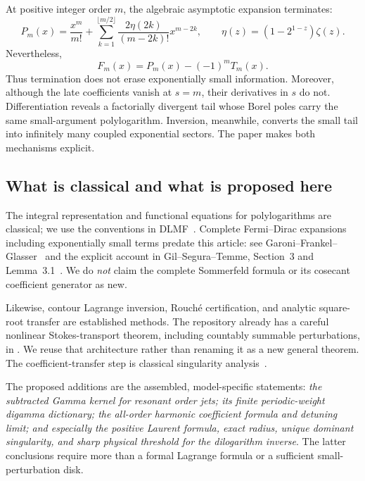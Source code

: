 \documentclass[11pt,a4paper]{article}
\theoremstyle{definition}\newtheorem{definition}[theorem]{Definition}
\theoremstyle{remark}\newtheorem{remark}[theorem]{Remark}
\numberwithin{equation}{section}
\begin{document}
At positive integer order $m$, the algebraic asymptotic expansion terminates:
\begin{equation}\label{eq:intro-polynomial}
 P_m(x)=\frac{x^m}{m!}
 +\sum_{k=1}^{\lfloor m/2\rfloor}
       \frac{2\eta(2k)}{(m-2k)!}x^{m-2k},
 \qquad \eta(z)=(1-2^{1-z})\zeta(z).
\end{equation}
Nevertheless,
\begin{equation}\label{eq:intro-exact}
 F_m(x)=P_m(x)-(-1)^mT_m(x).
\end{equation}
Thus termination does not erase exponentially small information. Moreover,
although the late coefficients vanish at $s=m$, their derivatives in $s$
do not. Differentiation reveals a factorially divergent tail whose Borel
poles carry the same small-argument polylogarithm. Inversion, meanwhile,
converts the small tail into infinitely many coupled exponential sectors.
The paper makes both mechanisms explicit.

\subsection{What is classical and what is proposed here}

The integral representation and functional equations for polylogarithms
are classical; we use the conventions in DLMF~\cite{DLMFpoly}.
Complete Fermi--Dirac expansions including exponentially small terms predate
this article: see Garoni--Frankel--Glasser~\cite{GFG} and the explicit account
in Gil--Segura--Temme, Section~3 and Lemma~3.1~\cite{GST}. We do \emph{not}
claim the complete Sommerfeld formula or its cosecant coefficient generator
as new.

Likewise, contour Lagrange inversion, Rouch\'e certification, and analytic
square-root transfer are established methods. The repository already has a
careful nonlinear Stokes-transport theorem, including countably summable
perturbations, in \cite{RepoTransport}. We reuse that architecture rather
than renaming it as a new general theorem. The coefficient-transfer step is
classical singularity analysis~\cite{FO}.

The proposed additions are the assembled, model-specific statements:
\emph{the subtracted Gamma kernel for resonant order jets; its finite
periodic-weight digamma dictionary; the all-order harmonic coefficient
formula and detuning limit; and especially the positive Laurent formula,
exact radius, unique dominant singularity, and sharp physical threshold for
the dilogarithm inverse}. The latter conclusions require more than a formal
Lagrange formula or a sufficient small-perturbation disk.
\end{document}
